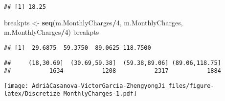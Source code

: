 \documentclass[
]{article}
\newenvironment{Shaded}{\begin{snugshade}}{\end{snugshade}}
\newcommand{\AttributeTok}[1]{\textcolor[rgb]{0.13,0.29,0.53}{#1}}
\newcommand{\DecValTok}[1]{\textcolor[rgb]{0.00,0.00,0.81}{#1}}
\newcommand{\FunctionTok}[1]{\textcolor[rgb]{0.13,0.29,0.53}{\textbf{#1}}}
\newcommand{\NormalTok}[1]{#1}
\newcommand{\OtherTok}[1]{\textcolor[rgb]{0.56,0.35,0.01}{#1}}
\newcommand{\SpecialCharTok}[1]{\textcolor[rgb]{0.81,0.36,0.00}{\textbf{#1}}}
\newcommand{\StringTok}[1]{\textcolor[rgb]{0.31,0.60,0.02}{#1}}
\begin{document}
\begin{verbatim}
## [1] 18.25
\end{verbatim}

\begin{Shaded}
\begin{Highlighting}[]
\NormalTok{breakpts }\OtherTok{\textless{}{-}} \FunctionTok{seq}\NormalTok{(m.MonthlyCharges}\SpecialCharTok{/}\DecValTok{4}\NormalTok{, m.MonthlyCharges, m.MonthlyCharges}\SpecialCharTok{/}\DecValTok{4}\NormalTok{)}
\NormalTok{breakpts}
\end{Highlighting}
\end{Shaded}

\begin{verbatim}
## [1]  29.6875  59.3750  89.0625 118.7500
\end{verbatim}

\begin{Shaded}
\begin{Highlighting}[]
\NormalTok{df}\SpecialCharTok{$}\NormalTok{c.MonthlyCharges }\OtherTok{\textless{}{-}} \FunctionTok{factor}\NormalTok{(df}\SpecialCharTok{$}\NormalTok{c.MonthlyCharges, }\AttributeTok{labels =} \FunctionTok{c}\NormalTok{(}\StringTok{"(18,30.69]"}\NormalTok{,}
    \StringTok{"(30.69,59.38]"}\NormalTok{, }\StringTok{"(59.38,89.06]"}\NormalTok{, }\StringTok{"(89.06,118.75]"}\NormalTok{))}
\FunctionTok{summary}\NormalTok{(df}\SpecialCharTok{$}\NormalTok{c.MonthlyCharges)}
\end{Highlighting}
\end{Shaded}

\begin{verbatim}
##     (18,30.69]  (30.69,59.38]  (59.38,89.06] (89.06,118.75] 
##           1634           1208           2317           1884
\end{verbatim}

\begin{Shaded}
\end{Shaded}

\texttt{[image: AdriàCasanova-VíctorGarcia-ZhengyongJi\_files/figure-latex/Discretize MonthlyCharges-1.pdf]}
\end{document}
